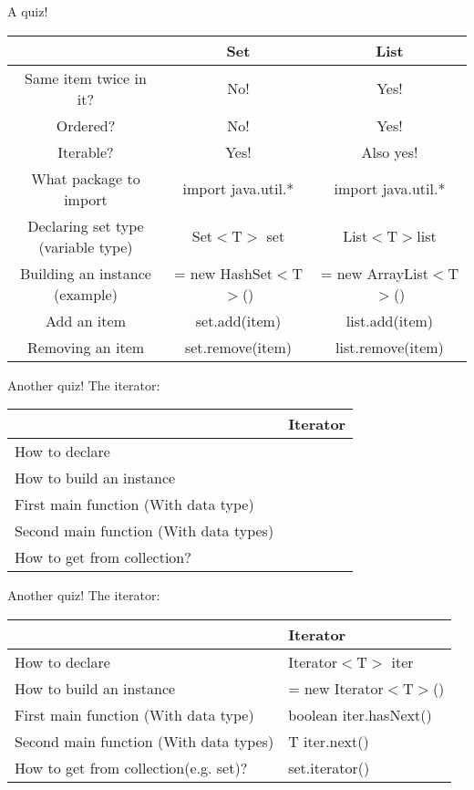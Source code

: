 \begin{frame}{A quiz!}
	\begin{tabular}{c|c|c}
		&Set&List\\
		\hline
		Same item twice in it? &No!&Yes!\\
		\hline
		Ordered?&No!&Yes!\\
		\hline
		Iterable?&Yes!&Also yes!\\
		\hline
		What package to import &import java.util.*&import java.util.*\\
		\hline
		Declaring set type (variable type)&Set$<$T$>$ set&List$<$T$> $list\\
		\hline
		Building an instance (example)&= new HashSet$<$T$>$()& = new ArrayList$<$T$>$()\\
		\hline
		Add an item&set.add(item)&list.add(item)\\
		\hline
		Removing an item&set.remove(item)&list.remove(item)\\
	\end{tabular}
\end{frame}

\begin{frame}{Another quiz!}
	The iterator:\\
	\vspace{1cm}
	\begin{tabular}{l|l}
		&Iterator\\
		\hline
		How to declare&\\
		\hline
		How to build an instance&\\
		\hline
		First main function (With data type)&\\
		\hline
		Second main function (With data types)&\\
		\hline
		How to get from collection?&\\
		
	\end{tabular}
\end{frame}

\begin{frame}{Another quiz!}
	The iterator:\\
	\vspace{1cm}
	\begin{tabular}{l|l}
		&Iterator\\
		\hline
		How to declare&Iterator$<$T$>$ iter\\
		\hline
		How to build an instance&= new Iterator$<$T$>$()\\
		\hline
		First main function (With data type)&boolean iter.hasNext()\\
		\hline
		Second main function (With data types)&T iter.next()\\
		\hline
		How to get from collection(e.g. set)?&set.iterator()\\
		
	\end{tabular}
\end{frame}

